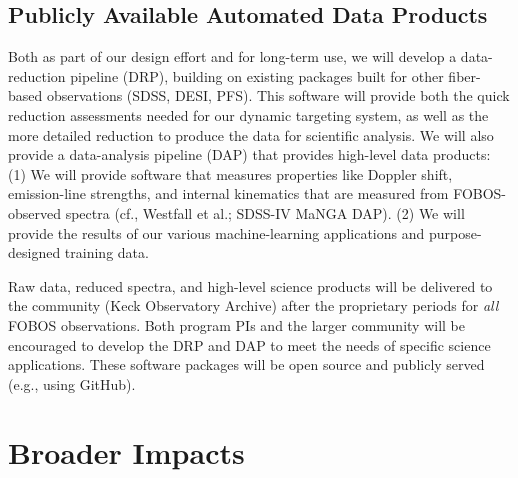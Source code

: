 \documentclass[oneside,11pt]{amsart}
\begin{document}
\subsection{Publicly Available Automated Data Products}
\label{sec:DAP}

Both as part of our design effort and for long-term use, we will develop
a data-reduction pipeline (DRP), building on existing packages built for
other fiber-based observations (SDSS, DESI, PFS).  This software will
provide both the quick reduction assessments needed for our dynamic
targeting system, as well as the more detailed reduction to produce the
data for scientific analysis.  We will also provide a data-analysis
pipeline (DAP) that provides high-level data products: (1) We will
provide software that measures properties like Doppler shift,
emission-line strengths, and internal kinematics that are measured from
FOBOS-observed spectra (cf., Westfall et al.; SDSS-IV MaNGA DAP).  (2) We
will provide the results of our various machine-learning applications
and purpose-designed training data.

Raw data, reduced spectra, and high-level science products will be
delivered to the community (Keck Observatory Archive) after the
proprietary periods for {\it all} FOBOS observations.  Both program PIs
and the larger community will be encouraged to develop the DRP and DAP
to meet the needs of specific science applications.  These software
packages will be open source and publicly served (e.g., using GitHub).

\section{Broader Impacts}
\label{sec:bi}
\end{document}
